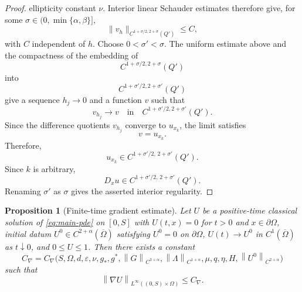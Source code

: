 \documentclass[11pt]{article}
\newtheorem{proposition}[theorem]{Proposition}
\theoremstyle{remark}
\newcommand{\eps}{\varepsilon}
\newcommand{\nupar}{\nu}
\newcommand{\norm}[1]{\left\lVert #1\right\rVert}
\begin{document}
\begin{proof}
ellipticity constant $\nupar$.
Interior linear Schauder estimates therefore give, for some
$\sigma\in(0,\min\{\alpha,\beta\}]$,
\[
 \|v_h\|_{C^{1+\sigma/2,2+\sigma}(Q')}
 \le C,
\]
with $C$ independent of $h$. Choose $0<\sigma'<\sigma$. The uniform
estimate above and the compactness of the embedding of
\[
C^{1+\sigma/2,2+\sigma}(Q')
\]
into
\[
C^{1+\sigma'/2,2+\sigma'}(Q')
\]
give a sequence $h_j\to0$ and a function $v$ such that
\[
v_{h_j}\longrightarrow v
\quad\text{in}\quad
C^{1+\sigma'/2,2+\sigma'}(Q').
\]
Since the difference quotients $v_{h_j}$ converge to $u_{x_k}$, the limit satisfies
\[
v=u_{x_k}.
\]
Therefore,
\[
u_{x_k}\in C^{1+\sigma'/2,\,2+\sigma'}(Q').
\]
Since $k$ is arbitrary,
\[
D_xu\in C^{1+\sigma'/2,\,2+\sigma'}(Q').
\]
Renaming $\sigma'$ as $\sigma$ gives the asserted interior regularity.
\end{proof}

\begin{proposition}[Finite-time gradient estimate]\label{prop:finite-gradient}
Let $U$ be a positive-time classical solution of \eqref{eq:main-pde} on $[0,S]$ with $U(t,x)=0$ for $t>0$ and $x\in\partial\Omega$, initial datum $U^0\in C^{2+\alpha}(\overline\Omega)$ satisfying $U^0=0$ on $\partial\Omega$, $U(t)\to U^0$ in $C^1(\overline\Omega)$ as $t\downarrow0$, and $0\le U\le1$.  Then there exists a constant
\[
        C_{\nabla}=C_{\nabla}\bigl(S,\Omega,d,\eps,\nupar,g_*,g^*,
        \norm{G}_{C^{3+\alpha}},\norm{\Lambda}_{C^{1+\alpha}},
        \mu,q,\eta,H,\norm{U^0}_{C^{2+\alpha}}\bigr)
\]
such that
\[
        \norm{\nabla U}_{L^\infty((0,S)\times\Omega)}\le C_{\nabla}.
\]
\end{proposition}
\end{document}
